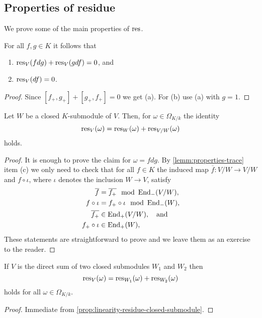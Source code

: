 \subsection*{Properties of residue}
We prove some of the main properties of $\operatorname{res}$.
\begin{proposition}\label{prop:linearity-residue}
	For all $f,g \in K$ it follows that
	\begin{enumerate}[label = (\alph*)]
		\item $\operatorname{res}_{V}(fdg) + \operatorname{res}_{V}(gdf) = 0$, and
		\item $\operatorname{res}_V(df) = 0$.
	\end{enumerate}
\end{proposition}
\begin{proof}
	Since $[f_{+}, g_{+}] + [g_{+}, f_{+}] = 0$ we get (a). For (b) use (a) with $g = 1$. 
\end{proof}
\begin{proposition}\label{prop:linearity-residue-closed-submodule}
	Let $W$ be a closed $K$-submodule of $V$. Then, for $\omega \in \Omega_{K/k}$ the identity
	\[
		\operatorname{res}_{V}(\omega) = \operatorname{res}_{W}(\omega) + \operatorname{res}_{V/W}(\omega)
	\]
	holds.
\end{proposition}
\begin{proof}
	It is enough to prove the claim for $\omega = f dg$. By \cref{lemm:properties-trace} item (c) we only need to check that for all $f \in K$ the induced map $\overline{f}\colon V/W \to V/W$ and $f \circ \iota$, where $\iota$ denotes the inclusion $W \to V$, satisfy
	\begin{align*}
	\overline{f} &= \overline{f_{+}} \mod {\operatorname{End}}_{-}(V/W), \\
	f \circ \iota &= f_{+} \circ \iota \mod {\operatorname{End}}_{-}(W), \\ 
	\overline{f_{+}}&\in \operatorname{End}_{+}(V/W), \quad\text{and} \\
	f_{+} \circ \iota &\in \operatorname{End}_{+}(W),
	\end{align*}
	These statements are straightforward to prove and we leave them as an exercise to the reader.
\end{proof}
\begin{proposition}\label{prop:direct-sum-residue}
	If $V$ is the direct sum of two closed submodules $W_{1}$ and $W_{2}$ then 
	\[
		\operatorname{res}_{V}(\omega) = \operatorname{res}_{W_{1}}(\omega) + \operatorname{res}_{W_{2}}(\omega)
	\]
	holds for all $\omega \in \Omega_{K/k}$.
\end{proposition}
\begin{proof}
	Immediate from \cref{prop:linearity-residue-closed-submodule}.
\end{proof}
